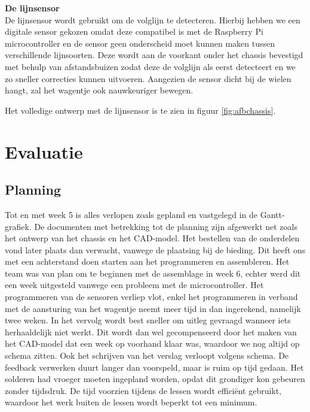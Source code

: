 \documentclass[a4paper,kulak]{kulakarticle}
\begin{document}
\textbf{\large De lijnsensor} \\
De lijnsensor wordt gebruikt om de volglijn te detecteren. Hierbij hebben we een digitale sensor gekozen omdat deze compatibel is met de Raspberry Pi microcontroller en de sensor geen onderscheid moet kunnen maken tussen verschillende lijnsoorten. Deze wordt aan de voorkant onder het chassis bevestigd met behulp van afstandsbuizen zodat deze de volglijn als eerst detecteert en we zo sneller correcties kunnen uitvoeren. Aangezien de sensor dicht bij de wielen hangt, zal het wagentje ook nauwkeuriger bewegen.

Het volledige ontwerp met de lijnsensor is te zien in figuur \ref{fig:afbchassis}.


	
\section{Evaluatie}

\subsection{Planning}
Tot en met week 5 is alles verlopen zoals gepland en vastgelegd in de Gantt-grafiek. De documenten met betrekking tot de planning zijn afgewerkt net zoals het ontwerp van het chassis en het CAD-model. Het bestellen van de onderdelen vond later plaats dan verwacht, vanwege de plaatsing bij de bieding. Dit heeft ons met een achterstand doen starten aan het programmeren en assembleren. Het team was van plan om te beginnen met de assemblage in week 6, echter werd dit een week uitgesteld vanwege een probleem met de microcontroller. Het programmeren van de sensoren verliep vlot, enkel het programmeren in verband met de aansturing van het wagentje neemt meer tijd in dan ingerekend, namelijk twee weken. In het vervolg wordt best sneller om uitleg gevraagd wanneer iets herhaaldelijk niet werkt. Dit wordt dan wel gecompenseerd door het maken van het CAD-model dat een week op voorhand klaar was, waardoor we nog altijd op schema zitten. Ook het schrijven van het verslag verloopt volgens schema. De feedback verwerken duurt langer dan voorspeld, maar is ruim op tijd gedaan. Het solderen had vroeger moeten ingepland worden, opdat dit grondiger kon gebeuren zonder tijdsdruk. De tijd voorzien tijdens de lessen wordt efficiënt gebruikt, waardoor het werk buiten de lessen wordt beperkt tot een minimum.
\end{document}
